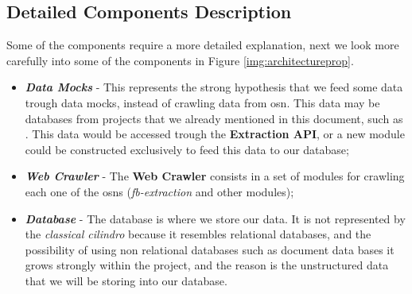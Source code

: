 \subsection{Detailed Components Description}
Some of the components require a more detailed explanation, next we look more carefully into some of the components in Figure \ref{img:architectureprop}.
\begin{itemize}
    \item \textbf{\textit{Data Mocks}} - This represents the strong hypothesis that we feed some data trough data mocks, instead of crawling data from \gls{osn}. This data may be databases from projects that we already mentioned in this document, such as \cite{kunegis2013konect}. This data would be accessed trough the \textbf{Extraction API}, or a new module could be constructed exclusively to feed this data to our database;
    \item \textbf{\textit{Web Crawler}} - The \textbf{Web Crawler} consists in a set of modules for crawling each one of the \glspl{osn} (\textit{fb-extraction} and other modules);
    \item \textbf{\textit{Database}} - The database is where we store our data. It is not represented by the \textit{classical cilindro} because it resembles relational databases, and the possibility of using non relational databases such as document data bases it grows strongly within the project, and the reason is the unstructured data that we will be storing into our database.
\end{itemize}
